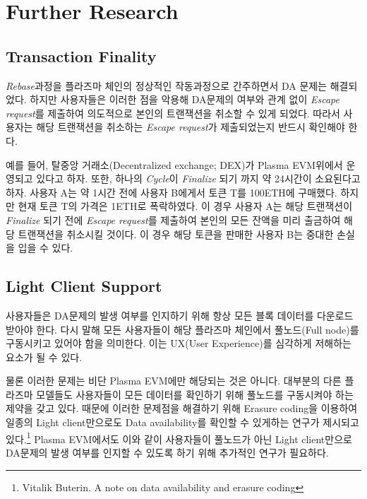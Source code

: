 \documentclass[letterpaper, 11pt]{article}
\begin{document}
\section{Further Research}
\subsection{Transaction Finality}
\begin{CJK}{UTF8}{mj}
\emph{Rebase}과정을 플라즈마 체인의 정상적인 작동과정으로 간주하면서 DA 문제는 해결되었다. 하지만 사용자들은 이러한 점을 악용해 DA문제의 여부와 관계 없이 \emph{Escape request}를 제출하여 의도적으로 본인의 트랜잭션을 취소할 수 있게 되었다. 따라서 사용자는 해당 트랜잭션을 취소하는 \emph{Escape request}가 제출되었는지 반드시 확인해야 한다.

예를 들어, 탈중앙 거래소(Decentralized exchange; DEX)가 Plasma EVM위에서 운영되고 있다고 하자. 또한, 하나의 \emph{Cycle}이 \emph{Finalize} 되기 까지 약 24시간이 소요된다고 하자. 사용자 A는 약 1시간 전에 사용자 B에게서 토큰 T를 100ETH에 구매했다. 하지만 현재 토큰 T의 가격은 1ETH로 폭락하였다. 이 경우 사용자 A는 해당 트랜잭션이 \emph{Finalize} 되기 전에 \emph{Escape request}를 제출하여 본인의 모든 잔액을 미리 출금하여 해당 트랜잭션을 취소시킬 것이다. 이 경우 해당 토큰을 판매한 사용자 B는 중대한 손실을 입을 수 있다.
\end{CJK}

\subsection{Light Client Support}
\begin{CJK}{UTF8}{mj}
사용자들은 DA문제의 발생 여부를 인지하기 위해 항상 모든 블록 데이터를 다운로드 받아야 한다. 다시 말해 모든 사용자들이 해당 플라즈마 체인에서 풀노드(Full node)를 구동시키고 있어야 함을 의미한다. 이는 UX(User Experience)를 심각하게 저해하는 요소가 될 수 있다.

물론 이러한 문제는 비단 Plasma EVM에만 해당되는 것은 아니다. 대부분의 다른 플라즈마 모델들도 사용자들이 모든 데이터를 확인하기 위해 풀노드를 구동시켜야 하는 제약을 갖고 있다. 때문에 이러한 문제점을 해결하기 위해 Erasure coding을 이용하여 일종의 Light client만으로도 Data availability를 확인할 수 있게하는 연구가 제시되고 있다.\footnote{Vitalik Buterin. A note on data availability and erasure coding} Plasma EVM에서도 이와 같이 사용자들이 풀노드가 아닌 Light client만으로 DA문제의 발생 여부를 인지할 수 있도록 하기 위해 추가적인 연구가 필요하다.
\end{CJK}
\end{document}
